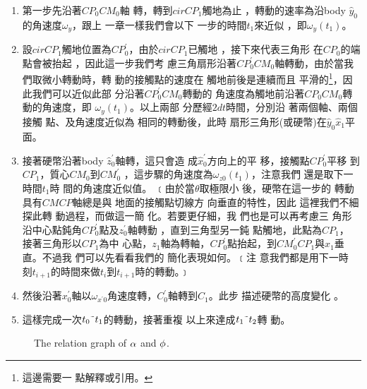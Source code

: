 \documentclass[12pt,twoside]{article}
\begin{document}
\begin{enumerate}
\item 第一步先沿著$CP_{0}CM_{0}$軸%
轉，轉到$cirCP_{1}$觸地為止%
，轉動的速率為沿body $\hat{y}%
_{0}$的角速度$\omega _{y}$，跟上%
一章一樣我們會以下%
一步的時間$t_{1}$來近似%
，即$\omega _{y}\left( t_{1}\right) $。

\item 設$cirCP_{1}$觸地位置為$%
CP_{0}^{\prime }$，由於$cirCP_{1}$已觸地%
，接下來代表三角形%
在$CP_{0}$的端點會被抬起%
，因此這一步我們考%
慮三角扇形沿著$CP_{0}^{\prime
}CM_{0}$軸轉動，由於當我%
們取微小轉動時，轉%
動的接觸點的速度在%
觸地前後是連續而且%
平滑的\footnote{這邊需要一%
點解釋或引用。}，因%
此我們可以近似此部%
分沿著$CP_{0}^{\prime }CM_{0}$轉動的%
角速度為觸地前沿著$%
CP_{0}CM_{0}$轉動的角速度，即%
$\omega _{y}\left( t_{1}\right) $。以上兩部%
分歷經$2dt$時間，分別沿%
著兩個軸、兩個接觸%
點、及角速度近似為%
相同的轉動後，此時%
扇形三角形(或硬幣)在$%
\hat{y}_{0}\hat{x}_{1}$平面。

\item 接著硬幣沿著body $\hat{z}%
_{0}^{\prime }$軸轉，這只會造%
成$\hat{x}_{0}^{\prime }$方向上的平%
移，接觸點$CP_{0}^{\prime }$平移%
到$CP_{1}$，質心$CM_{0}$到$CM_{0}^{\prime }$%
，這步驟的角速度為$%
\omega _{z0}\left( t_{1}\right) $，注意我們%
還是取下一時間$t_{1}$時%
間的角速度近似值。%
﹝由於當$\theta $取極限小%
後，硬幣在這一步的%
轉動具有$CMCP$軸總是與%
地面的接觸點切線方%
向垂直的特性，因此%
這裡我們不細探此轉%
動過程，而做這一簡%
化。若要更仔細，我%
們也是可以再考慮三%
角形沿中心點鈍角$%
CP_{0}^{\prime }$點及$z_{0}^{\prime }$軸轉動%
，直到三角型另一鈍%
點觸地，此點為$CP_{1}$，%
接著三角形以$CP_{1}$為中%
心點，$z_{1}$軸為轉軸，$%
CP_{0}^{\prime }$點抬起，到$CM_{0}^{\prime
}CP_{1}$與$x_{1}$垂直。不過我%
們可以先看看我們的%
簡化表現如何。﹝注%
意我們都是用下一時%
刻$t_{i+1}$的時間來做$t_{i}$到$%
t_{i+1}$時的轉動。﹞

\item 然後沿著$x_{0}^{\prime }$軸以$%
\omega _{x^{\prime }0}$角速度轉，$%
C_{0}^{\prime }$軸轉到$C_{1}$。此步%
描述硬幣的高度變化%
。

\item 這樣完成一次$t_{0}\symbol{126}%
t_{1} $的轉動，接著重複%
以上來達成$t_{1}\symbol{126}t_{2}$轉%
動。
\end{enumerate}

\begin{figure}[th]
\caption{{}The relation graph of $\protect\alpha $ and $\protect\phi $.}
\label{alphaphifig}
\begin{center}
\fbox{}
\end{center}
\end{figure}
\end{document}
